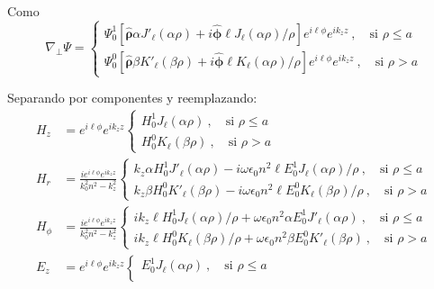 Como 
\begin{equation*}
	\nabla_\perp \Psi =
	\left\{	
	\begin{matrix}
		\Psi_0^1\left[\boldsymbol{\hat{\rho}}\alpha J'_\ell (\alpha \rho) + i \boldsymbol{\hat{\phi}} \ell J_\ell (\alpha \rho)/\rho\right] e^{i\ell\phi} e^{i k_z z} \ , \quad \text{si } \rho \le a  
		\\
		\Psi_0^0\left[\boldsymbol{\hat{\rho}}\beta K'_\ell (\beta\rho) +i \boldsymbol{\hat{\phi}}\ell K_\ell (\alpha \rho)/\rho \right]e^{i\ell\phi} e^{i k_z z} \ , \quad \text{si } \rho > a  
	\end{matrix}
	\right.
\end{equation*}

Separando por componentes y reemplazando:
\begin{align*}
		H_z &=  e^{i\ell\phi}e^{i k_z z}
	  	 \left\{
		\begin{matrix}	  	 
	  	 H_0^1 J_\ell (\alpha \rho) \ , \quad \text{si } \rho \le a  
	  	 \\
	  	 H_0^0 K_\ell (\beta \rho) \ , \quad \text{si } \rho > a  
	  	 \end{matrix}
	  	 \right.	
		\\
	  	 H_r &= \frac{i e^{i\ell\phi}e^{i k_z z} }{k_0^2 n^2 - k_z^2}
	  	 \left\{
		\begin{matrix}	  	 
	  	  k_z \alpha H_0^1 J'_\ell (\alpha \rho) - i\omega \epsilon_0 n^2\ell E_0^1 J_\ell (\alpha \rho)/\rho \ , \quad \text{si } \rho \le a  
	  	 \\
	  	 k_z \beta H_0^0  K'_\ell (\beta \rho) - i\omega \epsilon_0 n^2\ell E_0^0 K_\ell (\beta \rho)/\rho \ , \quad \text{si } \rho > a  
	  	 \end{matrix}
	  	 \right.
	  	 \\
		H_\phi &= \frac{ie^{i\ell\phi} e^{i k_z z}}{k_0^2 n^2 - k_z^2}
		\left\{
		\begin{matrix}
			ik_z\ell H_0^1  J_\ell (\alpha \rho)/\rho + \omega \epsilon_0 n^2  \alpha E_0^1 J'_\ell (\alpha \rho) \ , \quad \text{si } \rho \le a  
			\\
			ik_z \ell H_0^0  K_\ell (\beta \rho)/\rho + \omega \epsilon_0 n^2 \beta E_0^0  K'_\ell (\beta \rho) \ , \quad \text{si } \rho > a  
		\end{matrix}
		\right.
		\\
		E_z &= e^{i\ell\phi} e^{i k_z z}
	  	 \left\{
		\begin{matrix}	  	 
	  	 E_0^1 J_\ell (\alpha \rho) \ , \quad \text{si } \rho \le a  
	  	 \\

\end{matrix}
\end{align*}
